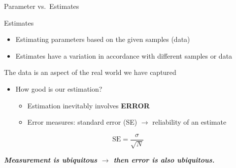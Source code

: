 \documentclass[9pt,ignorenonframetext,xcolor=dvipsnames]{beamer}
\providecommand{\tightlist}{%
  \setlength{\itemsep}{0pt}\setlength{\parskip}{0pt}}
\newlength{\wideitemsep}
\let\olditem\item
\renewcommand{\item}{\setlength{\itemsep}{\wideitemsep}\olditem}
\begin{document}
\begin{frame}{Parameter vs.~Estimates}

\begin{block}{Estimates}

\begin{itemize}
\tightlist
\item
  Estimating parameters based on the given samples (data)
\item
  Estimates have a variation in accordance with different samples or
  data
\end{itemize}

\begin{mdframed}[backgroundcolor = gray!30]

The data is an aspect of the real world we have captured

\end{mdframed}

\begin{itemize}
\tightlist
\item
  How good is our estimation?

  \begin{itemize}
  \tightlist
  \item
    Estimation inevitably involves \textbf{ERROR}
  \item
    Error measures: standard error (SE) \(\rightarrow\) reliability of
    an estimate
  \end{itemize}
\end{itemize}

\[
  \mathrm{SE} = \frac{\sigma}{\sqrt{N}}
\]

\begin{mdframed}[backgroundcolor = gray!30]
\textbf{\textit{Measurement is ubiquitous $\rightarrow$ then error is also ubiquitous.}}
\end{mdframed}

\end{block}

\end{frame}
\end{document}
